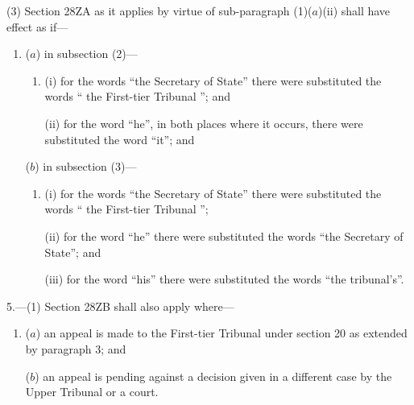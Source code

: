 \documentclass[12pt,a4paper]{article}
\begin{document}
(3) Section 28ZA as it applies by virtue of sub-paragraph (1)($a$)(ii) shall have effect as if—
\begin{enumerate}\item[]
($a$) in subsection (2)—
\begin{enumerate}\item[]
(i) for the words “the Secretary of State” there were substituted the words “%
the First-tier Tribunal%
''; and

(ii) for the word “he”, in both places where it occurs, there were substituted the word “it”; and
\end{enumerate}

($b$) in subsection (3)—
\begin{enumerate}\item[]
(i) for the words “the Secretary of State” there were substituted the words “%
the First-tier Tribunal%
”;

(ii) for the word “he” there were substituted the words “the Secretary of State”; and

(iii) for the word “his” there were substituted the words “the tribunal's”.
\end{enumerate}
\end{enumerate}


\medskip

5.---(1) Section 28ZB shall also apply where—
\begin{enumerate}\item[]
($a$) an appeal is made to 
the First-tier Tribunal  %
under section 20 as extended by paragraph 3; and

($b$) an appeal is pending against a decision given in a different case by 
the Upper Tribunal  %
or a court.
\end{enumerate}
\end{document}
